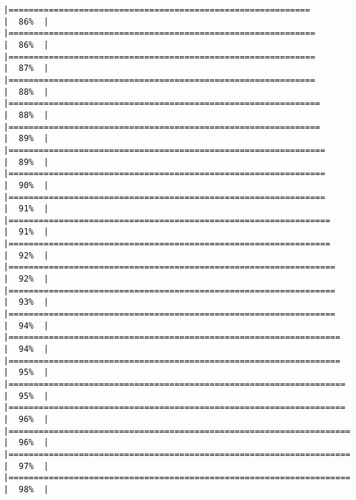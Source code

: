 \documentclass[10pt,letterpaper]{article}
\begin{document}
\begin{verbatim}
|============================================================          |  86%  |                                                                              |=============================================================         |  86%  |                                                                              |=============================================================         |  87%  |                                                                              |=============================================================         |  88%  |                                                                              |==============================================================        |  88%  |                                                                              |==============================================================        |  89%  |                                                                              |===============================================================       |  89%  |                                                                              |===============================================================       |  90%  |                                                                              |===============================================================       |  91%  |                                                                              |================================================================      |  91%  |                                                                              |================================================================      |  92%  |                                                                              |=================================================================     |  92%  |                                                                              |=================================================================     |  93%  |                                                                              |=================================================================     |  94%  |                                                                              |==================================================================    |  94%  |                                                                              |==================================================================    |  95%  |                                                                              |===================================================================   |  95%  |                                                                              |===================================================================   |  96%  |                                                                              |====================================================================  |  96%  |                                                                              |====================================================================  |  97%  |                                                                              |====================================================================  |  98%  |                                                                              
\end{verbatim}
\end{document}
